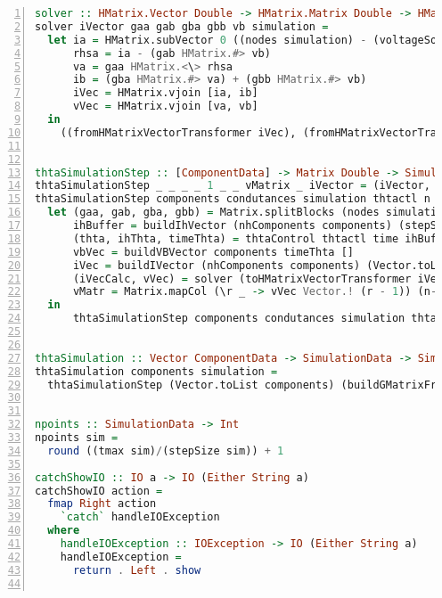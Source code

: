 \begin{lstlisting}[language=Haskell, numbers=left, caption={Main.hs file code}, captionpos=b, label={lst:maincompletecode}]
solver :: HMatrix.Vector Double -> HMatrix.Matrix Double -> HMatrix.Matrix Double -> HMatrix.Matrix Double -> HMatrix.Matrix Double -> HMatrix.Vector Double -> SimulationData -> (Vector Double, Vector Double)
solver iVector gaa gab gba gbb vb simulation =
  let ia = HMatrix.subVector 0 ((nodes simulation) - (voltageSources simulation)) iVector
      rhsa = ia - (gab HMatrix.#> vb)
      va = gaa HMatrix.<\> rhsa
      ib = (gba HMatrix.#> va) + (gbb HMatrix.#> vb)
      iVec = HMatrix.vjoin [ia, ib]      
      vVec = HMatrix.vjoin [va, vb]
  in
    ((fromHMatrixVectorTransformer iVec), (fromHMatrixVectorTransformer vVec))
      

thtaSimulationStep :: [ComponentData] -> Matrix Double -> SimulationData -> Int -> Int -> Double  -> Vector Double -> Matrix Double -> Vector Double -> Vector Double -> SimulationResults
thtaSimulationStep _ _ _ _ 1 _ _ vMatrix _ iVector = (iVector, vMatrix)
thtaSimulationStep components condutances simulation thtactl n time ih vMatrix vbVector iVector =
  let (gaa, gab, gba, gbb) = Matrix.splitBlocks (nodes simulation - voltageSources simulation) (nodes simulation - voltageSources simulation) condutances
      ihBuffer = buildIhVector (nhComponents components) (stepSize simulation) n (Vector.toList ih) [] vMatrix
      (thta, ihThta, timeThta) = thtaControl thtactl time ihBuffer ih simulation
      vbVec = buildVBVector components timeThta []
      iVec = buildIVector (nhComponents components) (Vector.toList ihThta) (Vector.replicate (nodes simulation) 0)
      (iVecCalc, vVec) = solver (toHMatrixVectorTransformer iVec) (toHMatrixTransformer gaa) (toHMatrixTransformer gab) (toHMatrixTransformer gba) (toHMatrixTransformer gbb) (toHMatrixVectorTransformer vbVec) simulation
      vMatr = Matrix.mapCol (\r _ -> vVec Vector.! (r - 1)) (n-1) vMatrix
  in
      thtaSimulationStep components condutances simulation thta (n-1) timeThta ihThta vMatr vbVec iVecCalc


thtaSimulation :: Vector ComponentData -> SimulationData -> SimulationResults
thtaSimulation components simulation = 
  thtaSimulationStep (Vector.toList components) (buildGMatrixFromVector simulation components) simulation 1 (npoints simulation) 0.0 (Vector.replicate (nh components) 0) (Matrix.zero (nodes simulation) (npoints simulation)) (Vector.replicate (voltageSources simulation) 0) (Vector.replicate (nodes simulation) 0)


npoints :: SimulationData -> Int
npoints sim = 
  round ((tmax sim)/(stepSize sim)) + 1

catchShowIO :: IO a -> IO (Either String a)
catchShowIO action =
  fmap Right action
    `catch` handleIOException
  where
    handleIOException :: IOException -> IO (Either String a)
    handleIOException =
      return . Left . show


\end{lstlisting}
